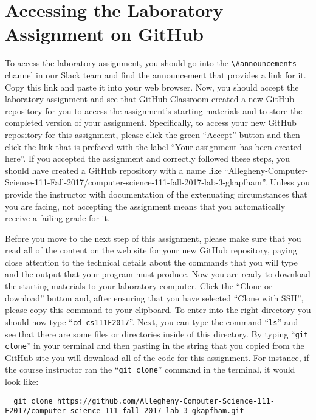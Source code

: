 \documentclass[11pt]{article}
\newcommand{\command}[1]{``\lstinline{#1}''}
\newcommand{\channel}[1]{\lstinline{#1}}
\begin{document}
\section*{Accessing the Laboratory Assignment on GitHub}

To access the laboratory assignment, you should go into the \channel{\#announcements} channel in our Slack team and find
the announcement that provides a link for it. Copy this link and paste it into your web browser. Now, you should accept
the laboratory assignment and see that GitHub Classroom created a new GitHub repository for you to access the
assignment's starting materials and to store the completed version of your assignment. Specifically, to access your new
GitHub repository for this assignment, please click the green ``Accept'' button and then click the link that is prefaced
with the label ``Your assignment has been created here''. If you accepted the assignment and correctly followed these
steps, you should have created a GitHub repository with a name like
``Allegheny-Computer-Science-111-Fall-2017/computer-science-111-fall-2017-lab-3-gkapfham''. Unless you provide the
instructor with documentation of the extenuating circumstances that you are facing, not accepting the assignment means
that you automatically receive a failing grade for it.

Before you move to the next step of this assignment, please make sure that you read all of the content on the web site
for your new GitHub repository, paying close attention to the technical details about the commands that you will type
and the output that your program must produce. Now you are ready to download the starting materials to your laboratory
computer. Click the ``Clone or download'' button and, after ensuring that you have selected ``Clone with SSH'', please
copy this command to your clipboard. To enter into the right directory you should now type \command{cd cs111F2017}.
Next, you can type the command \command{ls} and see that there are some files or directories inside of this directory.
By typing \command{git clone} in your terminal and then pasting in the string that you copied from the GitHub site you
will download all of the code for this assignment. For instance, if the course instructor ran the \command{git clone}
command in the terminal, it would look like:

\begin{lstlisting}
  git clone https://github.com/Allegheny-Computer-Science-111-F2017/computer-science-111-fall-2017-lab-3-gkapfham.git
\end{lstlisting}
\end{document}
